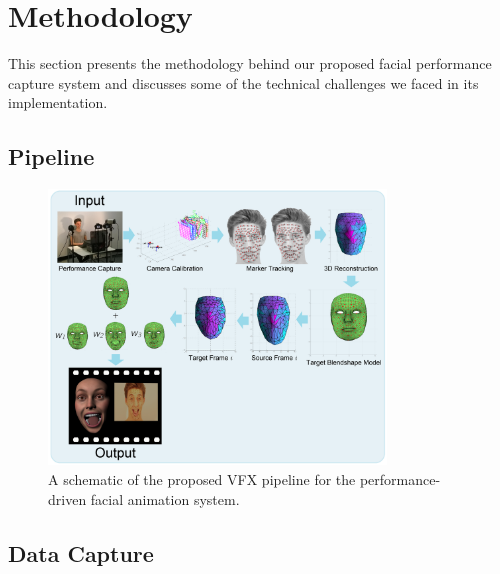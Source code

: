 \chapter{Methodology}
\label{sec:methods}

This section presents the methodology behind our proposed facial performance capture system and discusses some of the technical challenges we faced in its implementation.

\section{Pipeline}

\begin{figure}[htbp!]
\centering
\includegraphics[width=0.8\textwidth]{img/pipeline1}
	\caption{A schematic of the proposed VFX pipeline for the performance-driven facial animation system.}
	\label{fig:pipeline1}
\end{figure}

\newpage

\section{Data Capture} \label{sec:datacapture}

